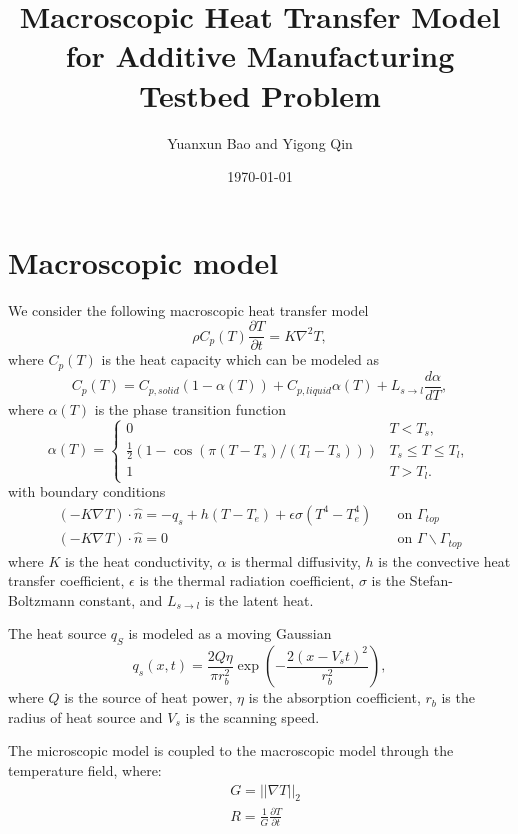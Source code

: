 \documentclass[a4paper,12pt]{article}
\title{Macroscopic Heat Transfer Model for Additive Manufacturing Testbed Problem}
\author{Yuanxun Bao and Yigong Qin}
\date{\today}
\newcommand{\grad}[1]{\nabla_{#1}}
\begin{document}
\maketitle

\section{Macroscopic model}
We consider the following macroscopic heat transfer model
\begin{equation}
\rho C_p(T) \frac{\partial T}{\partial t} = K \grad{}^2 T,
\end{equation}
where $C_p(T)$ is the heat capacity which can be modeled as
\begin{equation}
C_p(T) = C_{p,solid} ( 1-\alpha(T)) + C_{p,liquid} \alpha(T) + L_{s\rightarrow l} \frac{d \alpha}{ dT},
\end{equation}
where $\alpha(T)$ is the phase transition function
\begin{equation}
\alpha(T) = 
\left\{
\begin{array}{lr}
0 & T < T_s, \\
\frac{1}{2}( 1 - \cos(\pi (T-T_s)/ (T_l-T_s))) & T_s \leq T \leq T_l, \\
1 &  T > T_l.
\end{array}
\right.
\end{equation}
with boundary conditions 
\begin{align}
(-K \grad{} T) \cdot \hat{n} = -q_s + h(T - T_e) + \epsilon \sigma (T^4 - T_e^4)  & \quad \text{on } \Gamma_{top} \\
(-K \grad{} T) \cdot \hat{n} = 0  & \quad \text{on } \Gamma  \backslash \Gamma_{top}
\end{align}
where $K$ is the heat conductivity, $\alpha$ is thermal diffusivity, $h$ is the convective heat transfer coefficient, $\epsilon$ is the thermal radiation coefficient, $\sigma$ is the Stefan-Boltzmann constant, and $L_{s\rightarrow l}$ is the latent heat. 

The heat source $q_S$ is modeled as a moving Gaussian
\begin{equation}
q_s(x, t ) = \frac{2Q\eta}{\pi r_b^2} \exp \left( -\frac{ 2(x-V_s t)^2}{ r_b^2} \right),
\end{equation}
where $Q$ is the source of heat power, $\eta$ is the absorption coefficient, $r_b$ is the radius of heat source and $V_s$ is the scanning speed.  

The microscopic model  is coupled to the macroscopic model through the temperature field, where:
\begin{align}
    &G = ||\nabla {T}||_2 \\
    &R = \frac{1}{G}\frac{\partial {T}}{\partial t}
\end{align}
\end{document}
